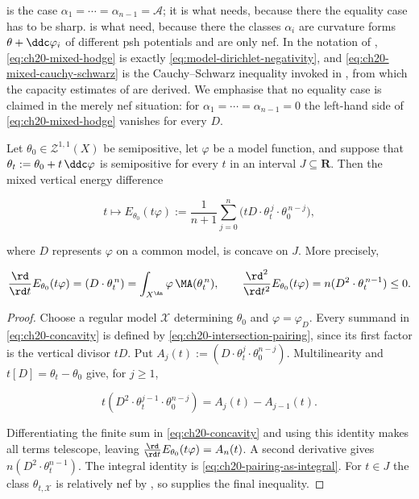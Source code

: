 \begin{remark}
\label{rem:ch20-hodge-uses}
 is the case
$\alpha_1=\cdots=\alpha_{n-1}=\mathcal A$; it is what
 needs, because there the equality case has to be
sharp.   is what
 need, because there the
classes $\alpha_i$ are curvature forms $\theta+\ddc\varphi_i$ of
different psh potentials and are only nef.  In the notation of
, \eqref{eq:ch20-mixed-hodge} is
exactly \eqref{eq:model-dirichlet-negativity}, and
\eqref{eq:ch20-mixed-cauchy-schwarz} is the Cauchy--Schwarz inequality
invoked in , from which the capacity
estimates of  are derived.  We emphasise that no
equality case is claimed in the merely nef situation: for
$\alpha_1=\cdots=\alpha_{n-1}=0$ the left-hand side of
\eqref{eq:ch20-mixed-hodge} vanishes for every $D$.
\end{remark}

\begin{corollary}
\label{cor:ch20-concavity}
Let $\theta_0\in\mathcal Z^{1,1}(X)$ be semipositive, let $\varphi$ be a
model function, and suppose that $\theta_t:=\theta_0+t\,\ddc\varphi$ is
semipositive for every $t$ in an interval $J\subseteq\mathbf R$.  Then
the mixed vertical energy difference

\begin{equation}
\label{eq:ch20-concavity}
 t\longmapsto E_{\theta_0}(t\varphi)
 :=\frac1{n+1}\sum_{j=0}^n
   \bigl(tD\cdot\theta_t^{\,j}\cdot\theta_0^{\,n-j}\bigr),
\end{equation}

where $D$ represents $\varphi$ on a common model, is concave on $J$.
More precisely,

\[
 \frac{\rd}{\rd t}E_{\theta_0}(t\varphi)
   =(D\cdot\theta_t^{\,n})
   =\int_{X^{\An}}\varphi\,\MA(\theta_t^{\,n}),
 \qquad
 \frac{\rd^2}{\rd t^2}E_{\theta_0}(t\varphi)
   =n(D^2\cdot\theta_t^{\,n-1})\leq0.
\]
\end{corollary}

\begin{proof}
Choose a regular model $\mathcal X$ determining $\theta_0$ and
$\varphi=\varphi_D$.  Every summand in
\eqref{eq:ch20-concavity} is defined by
\eqref{eq:ch20-intersection-pairing}, since its first factor is the vertical
divisor $tD$.  Put
$A_j(t):=(D\cdot\theta_t^j\cdot\theta_0^{n-j})$.  Multilinearity and
$t[D]=\theta_t-\theta_0$ give, for $j\geq1$,

\[
 t(D^2\cdot\theta_t^{j-1}\cdot\theta_0^{n-j})
 =A_j(t)-A_{j-1}(t).
\]

Differentiating the finite sum in \eqref{eq:ch20-concavity} and using this
identity makes all terms telescope, leaving
$\frac{\rd}{\rd t}E_{\theta_0}(t\varphi)=A_n(t)$.  A second derivative
gives $n(D^2\cdot\theta_t^{n-1})$.  The integral identity is
\eqref{eq:ch20-pairing-as-integral}.  For $t\in J$ the class
$\theta_{t,\mathcal X}$ is relatively nef by
, so
 supplies the final inequality.
\end{proof}


